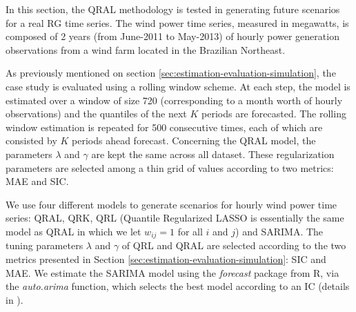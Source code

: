


In this section, the QRAL methodology is tested in generating future scenarios for a real RG time series. The wind power time series, measured in megawatts, is composed of 2 years (from June-2011 to May-2013) of hourly power generation observations from a wind farm located in the Brazilian Northeast. %

As previously mentioned on section \ref{sec:estimation-evaluation-simulation}, the case study is evaluated using a rolling window scheme. At each step, the model is estimated over a window of size 720 (corresponding to a month worth of hourly observations) and the quantiles of the next $K$ periods are forecasted. The rolling window estimation is repeated for 500 consecutive times, each of which are consisted by $K$ periods ahead forecast.
Concerning the QRAL model, the parameters $\lambda$ and $\gamma$ are kept the same across all dataset. These regularization parameters are selected among a thin grid of values according to two metrics: MAE and SIC.

We use four different models to generate scenarios for hourly wind power time series:  QRAL, QRK, QRL (Quantile Regularized LASSO is essentially the same model as QRAL in which we let $w_{ij} = 1$ for all $i$ and $j$) and SARIMA. 
The tuning parameters $\lambda$ and $\gamma$ of QRL and QRAL are selected according to the two metrics presented in Section \ref{sec:estimation-evaluation-simulation}: SIC and MAE.
We estimate the SARIMA model using the \emph{forecast} \cite{hyndman2008forecastpackage} package from R, via the \emph{auto.arima} function, which selects the best model according to an IC (details in \cite{hyndman2008forecastmanual}).


